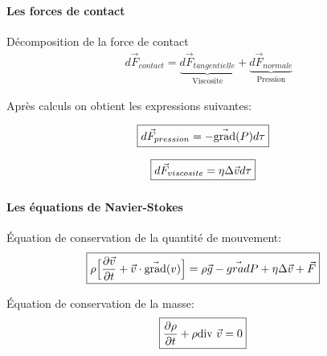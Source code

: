 \begin{frame}
	\frametitle{\fstpti}
	\framesubtitle{Les forces de contact}

	\noindent
	\begin{minipage}[t]{0.6\textwidth}
		Décomposition de la force de contact
		\begin{align*}
			d\vec{F}_{contact} = \underbrace{d\vec{F}_{tangentielle}}_\text{Viscosite} 	+ \underbrace{d\vec{F}_{normale}}_\text{Pression}
		\end{align*}
	\end{minipage}%
	\begin{minipage}[t]{0.4\textwidth}
	\end{minipage}

	Après calculs on obtient les expressions suivantes:

	\noindent
	\begin{minipage}[t]{0.5\textwidth}
		\begin{align*}
			\Aboxed{d\vec{F}_{pression} = -\vec{\text{grad}}(P)d\tau}
		\end{align*}
	\end{minipage}%
	\begin{minipage}[t]{0.5\textwidth}
		\begin{align*}
			\Aboxed{d\vec{F}_{viscosite} = \eta \Delta \vec{v} d\tau}
		\end{align*}
	\end{minipage}

\end{frame}


\begin{frame}
	\frametitle{\fstpti}
	\framesubtitle{Les équations de Navier-Stokes}
	
	Équation de conservation de la quantité de mouvement:
	\begin{align*}
		\Aboxed{\rho \Big [\frac{\partial \vec{v}}{\partial t} +\vec{v} \cdot \vec{\text{grad}}(v) \Big ]= \rho \vec{g} - \vec{grad} P + \eta \Delta \vec{v} + \vec{F}}
	\end{align*}

	Équation de conservation de la masse:
	\begin{align*}
		\Aboxed{\frac{\partial \rho}{\partial t} + \rho \text{div } \vec{v} = 0}
	\end{align*}

\end{frame}
